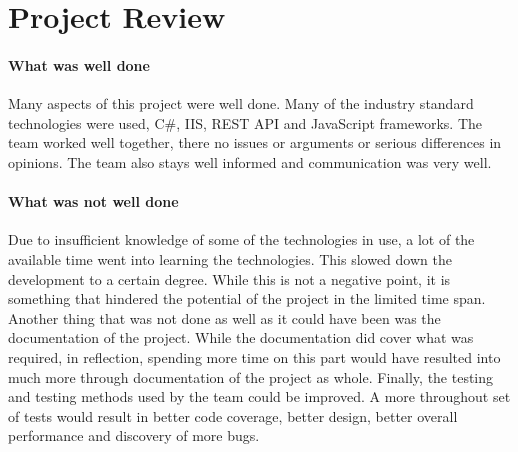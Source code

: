 \documentclass{article}
\begin{document}
\section{Project Review}
\paragraph{What was well done\\}
Many aspects of this project were well done. Many of the industry standard
technologies were used, C\#, IIS, REST API and JavaScript frameworks. The team
worked well together, there no issues or arguments or serious differences in
opinions. The team also stays well informed and communication was very well.

\paragraph{What was not well done\\}
Due to insufficient knowledge of some of the technologies in use, a lot of
the available time went into learning the technologies. This slowed down the
development to a certain degree. While this is not a negative point, it is
something that hindered the potential of the project in the limited time span.
Another thing that was not done as well as it could have been was the
documentation of the project. While the documentation did cover what was
required, in reflection, spending more time on this part would have resulted
into much more through documentation of the project as whole. Finally, the
testing and testing methods used by the team could be improved. A more
throughout set of tests would result in better code coverage, better design,
better overall performance and discovery of more bugs.
\end{document}
